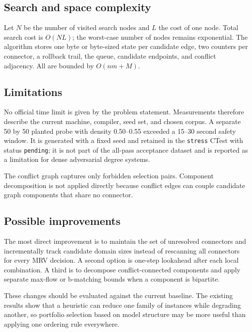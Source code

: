 \documentclass[11pt,a4paper,oneside]{article}
\begin{document}
\subsection{Search and space complexity}

Let $N$ be the number of visited search nodes and $L$ the cost of one node. Total
search cost is $O(NL)$; the worst-case number of nodes remains exponential. The
algorithm stores one byte or byte-sized state per candidate edge, two counters per
connector, a rollback trail, the queue, candidate endpoints, and conflict
adjacency. All are bounded by $O(nm+M)$.

\subsection{Limitations}

No official time limit is given by the problem statement. Measurements therefore
describe the current machine, compiler, seed set, and chosen corpus. A separate
50 by 50 planted probe with density 0.50--0.55 exceeded a 15--30 second safety
window. It is generated with a fixed seed and retained in the \texttt{stress}
CTest with status \texttt{pending}; it is not part of the all-pass acceptance
dataset and is reported as a limitation for dense adversarial degree systems.

The conflict graph captures only forbidden selection pairs. Component
decomposition is not applied directly because conflict edges can couple
candidate graph components that share no connector.

\subsection{Possible improvements}

The most direct improvement is to maintain the set of unresolved connectors and
incrementally track candidate domain sizes instead of rescanning all connectors
for every MRV decision. A second option is one-step lookahead after each local
combination. A third is to decompose conflict-connected components and apply
separate max-flow or b-matching bounds when a component is bipartite.

These changes should be evaluated against the current baseline. The existing
results show that a heuristic can reduce one family of instances while degrading
another, so portfolio selection based on model structure may be more useful than
applying one ordering rule everywhere.
\end{document}
